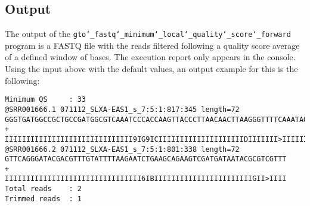 \subsection*{Output}
The output of the \texttt{gto\char`_fastq\char`_minimum\char`_local\char`_quality\char`_score\char`_forward} program is a FASTQ file with the reads filtered following a quality score average of a defined window of bases.
The execution report only appears in the console.\\
Using the input above with the default values, an output example for this is the following:
\begin{lstlisting}
Minimum QS     : 33
@SRR001666.1 071112_SLXA-EAS1_s_7:5:1:817:345 length=72
GGGTGATGGCCGCTGCCGATGGCGTCAAATCCCACCAAGTTACCCTTAACAACTTAAGGGTTTTCAAATAGA
+
IIIIIIIIIIIIIIIIIIIIIIIIIIIIII9IG9ICIIIIIIIIIIIIIIIIIIIIDIIIIIII>IIIIII/
@SRR001666.2 071112_SLXA-EAS1_s_7:5:1:801:338 length=72
GTTCAGGGATACGACGTTTGTATTTTAAGAATCTGAAGCAGAAGTCGATGATAATACGCGTCGTTT
+
IIIIIIIIIIIIIIIIIIIIIIIIIIIIIIII6IBIIIIIIIIIIIIIIIIIIIIIIIGII>IIII
Total reads    : 2
Trimmed reads  : 1
\end{lstlisting}